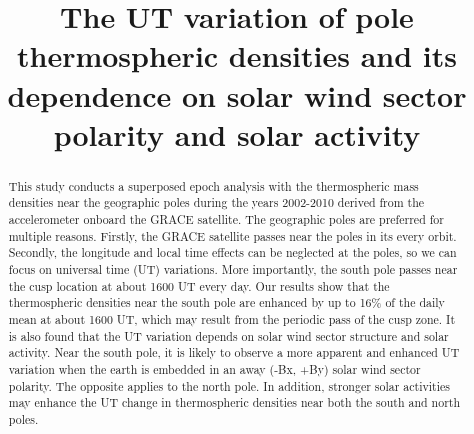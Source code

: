 \documentclass[draft,grl]{/home/gdj/文档/template/agu_template/AGUTeX}
\begin{document}
\title{The UT variation of pole thermospheric densities and its dependence on solar wind sector polarity and solar activity}


\begin{abstract} 
    This study conducts a superposed epoch analysis with the thermospheric mass densities near the geographic poles 
    during the years 2002-2010 derived from the accelerometer onboard the GRACE satellite. The geographic poles are 
    preferred for multiple reasons. Firstly, the GRACE satellite passes near the poles in its every orbit. Secondly,
    the longitude and local time effects can be neglected at the poles, so we can focus on universal time (UT)
    variations. More importantly, the south pole passes near the cusp location at about 1600 UT every day. Our results
    show that the thermospheric densities near the south pole are enhanced by up to 16\% of the daily mean at about 1600 
    UT, which may result from the periodic pass of the cusp zone. It is also found that the UT variation depends on solar
    wind sector structure and solar activity. Near the south pole, it is likely to observe a more apparent and 
    enhanced UT variation when the earth is embedded in an away (-Bx, +By) solar wind sector polarity. The opposite
    applies to the north pole. In addition, stronger solar activities may enhance the UT change in thermospheric 
    densities near both the south and north poles.
\end{abstract}
\end{document}
